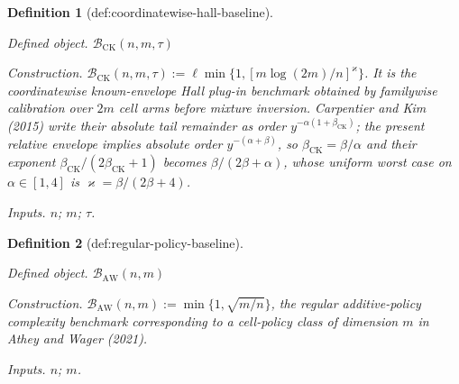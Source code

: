 \documentclass{article}
\newtheorem{definition}{Definition}
\begin{document}
\begin{definition}[def:coordinatewise-hall-baseline]\label{def:coordinatewise-hall-baseline}
\par\smallskip\noindent\emph{Defined object.} \(\mathcal B_{\mathrm{CK}}(n,m,\tau)\)
\par\smallskip\noindent\emph{Construction.} \(\mathcal B_{\mathrm{CK}}(n,m,\tau):=\ell\min\{1,[m\log(2m)/n]^{\varkappa}\}\). It is the coordinatewise known-envelope Hall plug-in benchmark obtained by familywise calibration over \(2m\) cell arms before mixture inversion. Carpentier and Kim (2015) write their absolute tail remainder as order \(y^{-\alpha(1+\beta_{\mathrm{CK}})}\); the present relative envelope implies absolute order \(y^{-(\alpha+\beta)}\), so \(\beta_{\mathrm{CK}}=\beta/\alpha\) and their exponent \(\beta_{\mathrm{CK}}/(2\beta_{\mathrm{CK}}+1)\) becomes \(\beta/(2\beta+\alpha)\), whose uniform worst case on \(\alpha\in[1,4]\) is \(\varkappa=\beta/(2\beta+4)\).
\par\smallskip\noindent\emph{Inputs.} \(n\); \(m\); \(\tau\).
\end{definition}

\begin{definition}[def:regular-policy-baseline]\label{def:regular-policy-baseline}
\par\smallskip\noindent\emph{Defined object.} \(\mathcal B_{\mathrm{AW}}(n,m)\)
\par\smallskip\noindent\emph{Construction.} \(\mathcal B_{\mathrm{AW}}(n,m):=\min\{1,\sqrt{m/n}\}\), the regular additive-policy complexity benchmark corresponding to a cell-policy class of dimension \(m\) in Athey and Wager (2021).
\par\smallskip\noindent\emph{Inputs.} \(n\); \(m\).
\end{definition}
\end{document}
